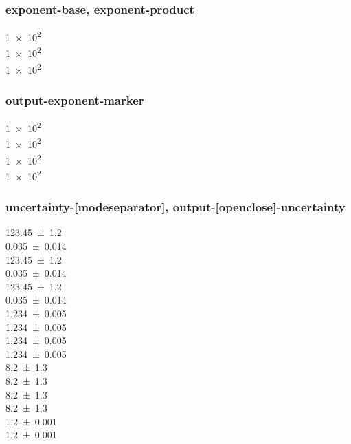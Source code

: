 \documentclass{article}
\begin{document}
\subsubsection{exponent-base, exponent-product}
\num[exponent-product = \times]{1e2} \\
\num[exponent-product = \cdot]{1e2} \\
\num[exponent-base = 2]{1e2}

\subsubsection{output-exponent-marker}
\num[output-exponent-marker = e]{1e2} \\
\num[output-exponent-marker = \text{e}]{1e2} \\
\num[output-exponent-marker = \mathrm{E}]{1e2}\\
\num[output-exponent-marker = \ensuremath{\mathrm{E}}]{1e2}

\subsubsection{uncertainty-[mode\textbar separator], output-[open\textbar close]-uncertainty}
{
\num{123.45(120)} \\
\num{0.035(14)} \\
\num{123.45(120)} \\
\num{0.035(14)} \\
\num{123.45(120)} \\
\num{0.035(14)} \\
%
\num{1.234(5)} \\
\num{1.234\pm 0.005} \\
\num[uncertainty-mode = separate]{1.234(5)} \\
\num[uncertainty-mode = separate]{1.234\pm 0.005} \\
\num{8.2(13)} \\
\num{8.2\pm1.3} \\
\num[uncertainty-mode = separate]{8.2(13)}\\
\num[uncertainty-mode = separate]{8.2\pm1.3} \\
\num{1.2 +- 0.001}\\
\num[uncertainty-mode = separate]{1.2 +- 0.001}\\
}
\end{document}
